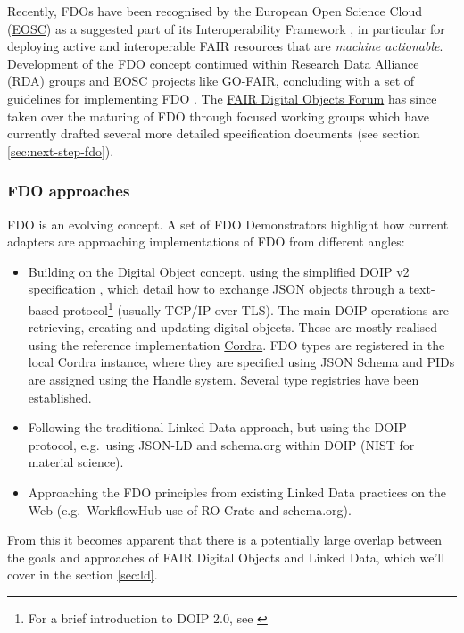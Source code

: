 \documentclass[fleqn,10pt,lineno]{wlpeerjlua}
\providecommand{\tightlist}{%
  \setlength{\itemsep}{0pt}\setlength{\parskip}{0pt}}
\begin{document}
Recently, FDOs have been recognised by the European Open Science Cloud (\href{https://eosc.eu/}{EOSC}) as a suggested part of its Interoperability Framework \cite{aCye3KpE}, in particular for deploying active and interoperable FAIR resources that are \emph{machine actionable}. Development of the FDO concept continued within Research Data Alliance (\href{https://www.rd-alliance.org/}{RDA}) groups and EOSC projects like \href{https://www.go-fair.org/}{GO-FAIR}, concluding with a set of guidelines for implementing FDO \cite{RwvirqWg}. The \href{https://fairdo.org/}{FAIR Digital Objects Forum} has since taken over the maturing of FDO through focused working groups which have currently drafted several more detailed specification documents (see section \ref{sec:next-step-fdo}).

\hypertarget{fdo-approaches}{%
\subsubsection*{FDO approaches}\label{fdo-approaches}}

FDO is an evolving concept. A set of FDO Demonstrators \cite{jRWurmQc} highlight how current adapters are approaching implementations of FDO from different angles:

\begin{itemize}
\tightlist
\item
  Building on the Digital Object concept, using the simplified DOIP v2 specification \cite{13TcbsZF6}, which detail how to exchange JSON objects through a text-based protocol\footnote{For a brief introduction to DOIP 2.0, see \cite{xuQKRRx5}} (usually TCP/IP over TLS). The main DOIP operations are retrieving, creating and updating digital objects. These are mostly realised using the reference implementation \href{https://cordra.org/}{Cordra}. FDO types are registered in the local Cordra instance, where they are specified using JSON Schema \cite{15EZ2D0Rm} and PIDs are assigned using the Handle system. Several type registries have been established.
\item
  Following the traditional Linked Data approach, but using the DOIP protocol, e.g.~using JSON-LD and schema.org within DOIP (NIST for material science).
\item
  Approaching the FDO principles from existing Linked Data practices on the Web (e.g.~WorkflowHub use of RO-Crate and schema.org).
\end{itemize}

From this it becomes apparent that there is a potentially large overlap between the goals and approaches of FAIR Digital Objects and Linked Data, which we'll cover in the section \ref{sec:ld}.
\end{document}
